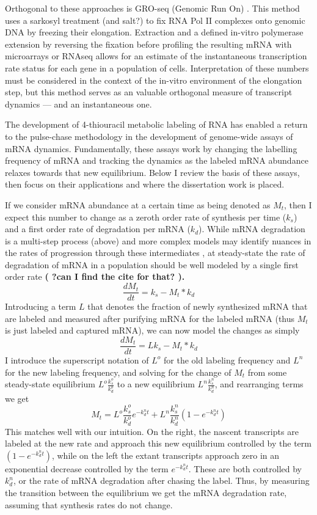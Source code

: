 {Orthogonal to these approaches is GRO-seq
(Genomic Run On)
\parencite{garcia2004genomic}. This method uses a sarkosyl treatment (and
salt?) to fix RNA Pol II complexes onto genomic DNA by freezing
their elongation. Extraction and a defined in-vitro polymerase
extension by reversing the fixation before profiling the resulting
mRNA with microarrays or RNAseq allows for an estimate of the
instantaneous transcription rate status for each gene in a population
of cells. Interpretation of these numbers must be considered in the
context of the in-vitro environment of the elongation step, but this
method serves as an valuable orthogonal measure of transcript dynamics
--- and an instantaneous one.  

The development of 4-thiouracil
metabolic labeling of RNA 
\parencite{dolken2008high}
has enabled a return to
the pulse-chase methodology in the development of genome-wide assays
of mRNA dynamics. Fundamentally, these assays work by changing the
labelling frequency of mRNA and tracking the dynamics as the labeled
mRNA abundance relaxes towards that new equilibrium. Below I review
the basis of these assays, then focus on their applications and where
the dissertation work is placed.  

If we consider mRNA abundance at a
certain time as being denoted as $M_t$, then I expect this number to
change as a zeroth order rate of synthesis per time ($k_s$) and a
first order rate of degradation per mRNA ($k_d$). While mRNA
degradation is a multi-step process (above) and more complex models
may identify nuances in the rates of progression through these
intermediates \parencite{deneke2013complex}, at steady-state the rate of
degradation of mRNA in a population should be well modeled by a single
first order rate 
\textbf{( ?can I find the cite for that? ).}
$$\frac{dM_t}{dt} = k_s - M_t*k_d$$ Introducing a term $L$ that
denotes the fraction of newly synthesized mRNA that are labeled and
measured after purifying mRNA for the labeled mRNA (thus $M_t$ is just
labeled and captured mRNA), we can now model the changes as simply
$$\frac{dM_t}{dt} = L k_s - M_t*k_d$$ I introduce the superscript
notation of $L^o$ for the old labeling frequency and $L^n$ for the new
labeling frequency, and solving for the change of $M_t$ from some
steady-state equilibrium $L^o \frac{k_s^o}{k_d^o}$ to a new
equilibrium $L^n \frac{k_s^n}{k_d^n}$, and rearranging terms we get
$$M_t =  L^o \frac{k_s^o}{k_d^o} e^{-k_d^n t} + L^n \frac{k_s^n}{k_d^n} ( 1- e^{-k_d^n t} )$$ 
This matches well with our
intuition. On the right, the nascent transcripts are labeled at the
new rate and approach this new equilibrium controlled by the term $(
1- e^{-k_d^n t} )$, while on the left the extant transcripts approach
zero in an exponential decrease controlled by the term $e^{-k_d^n t}$.
These are both controlled by $k_d^n$, or the rate of mRNA degradation
after chasing the label. Thus, by measuring the transition between the
equilibrium we get the mRNA degradation rate, assuming that synthesis
rates do not change.  

}
